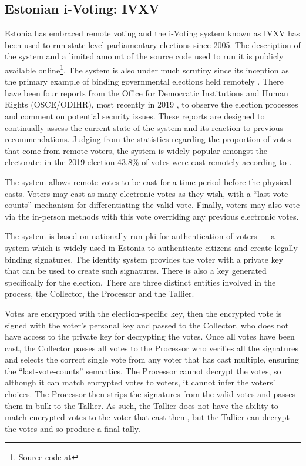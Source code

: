 \subsection{Estonian i-Voting: IVXV}

Estonia has embraced remote voting and the i-Voting system known as IVXV has been used to run state level parliamentary elections since 2005. The description of the system and a limited amount of the source code used to run it is publicly available online\footnote{Source code at }. The system is also under much scrutiny since its inception as the primary example of binding governmental elections held remotely . There have been four reports from the Office for Democratic Institutions and Human Rights (OSCE/ODIHR), most recently in 2019 \cite{OSCEODIHRElection2019}, to observe the election processes and comment on potential security issues. These reports are designed to continually assess the current state of the system and its reaction to previous recommendations. Judging from the statistics regarding the proportion of votes that come from remote voters, the system is widely popular amongst the electorate: in the 2019 election 43.8\% of votes were cast remotely according to \cite{OSCEODIHRElection2019}.

The system allows remote votes to be cast for a time period before the physical casts. Voters may cast as many electronic votes as they wish, with a ``last-vote-counts'' mechanism for differentiating the valid vote. Finally, voters may also vote via the in-person methods with this vote overriding any previous electronic votes.

The system is based on nationally run \gls{pki} for authentication of voters --- a system which is widely used in Estonia to authenticate citizens and create legally binding signatures. The identity system provides the voter with a private key that can be used to create such signatures. There is also a key generated specifically for the election. There are three distinct entities involved in the process, the Collector, the Processor and the Tallier.

Votes are encrypted with the election-specific key, then the encrypted vote is signed with the voter's personal key and passed to the Collector, who does not have access to the private key for decrypting the votes. Once all votes have been cast, the Collector passes all votes to the Processor who verifies all the signatures and selects the correct single vote from any voter that has cast multiple, ensuring the ``last-vote-counts'' semantics. The Processor cannot decrypt the votes, so although it can match encrypted votes to voters, it cannot infer the voters' choices. The Processor then strips the signatures from the valid votes and passes them in bulk to the Tallier. As such, the Tallier does not have the ability to match encrypted votes to the voter that cast them, but the Tallier can decrypt the votes and so produce a final tally.

